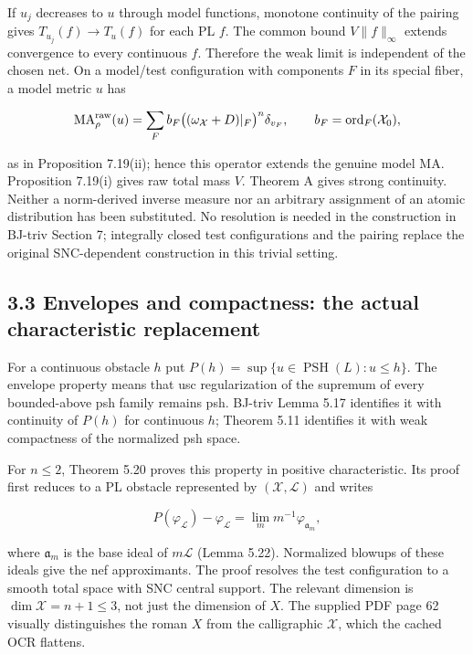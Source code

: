\documentclass[
  11pt,
]{article}
\begin{document}
If \(u_j\) decreases to \(u\) through model functions, monotone
continuity of the pairing gives \(T_{u_j}(f)\to T_u(f)\) for each PL
\(f\). The common bound \(V\|f\|_\infty\) extends convergence to every
continuous \(f\). Therefore the weak limit is independent of the chosen
net. On a model/test configuration with components \(F\) in its special
fiber, a model metric \(u\) has

\[\operatorname{MA}_{\rho}^{\rm raw}(u)=\sum_F b_F\bigl((\omega_{\mathcal X}+D)|_F\bigr)^n\delta_{v_F},\qquad b_F=\operatorname{ord}_F(\mathcal X_0),\]

as in Proposition 7.19(ii); hence this operator extends the genuine
model MA. Proposition 7.19(i) gives raw total mass \(V\). Theorem A
gives strong continuity. Neither a norm-derived inverse measure nor an
arbitrary assignment of an atomic distribution has been substituted. No
resolution is needed in the construction in BJ-triv Section 7;
integrally closed test configurations and the pairing replace the
original SNC-dependent construction in this trivial setting.

\subsection{3.3 Envelopes and compactness: the actual characteristic
replacement}\label{envelopes-and-compactness-the-actual-characteristic-replacement}

For a continuous obstacle \(h\) put
\(P(h)=\sup\{u\in\operatorname{PSH}(L):u\leq h\}\). The envelope
property means that usc regularization of the supremum of every
bounded-above psh family remains psh. BJ-triv Lemma 5.17 identifies it
with continuity of \(P(h)\) for continuous \(h\); Theorem 5.11
identifies it with weak compactness of the normalized psh space.

For \(n\leq2\), Theorem 5.20 proves this property in positive
characteristic. Its proof first reduces to a PL obstacle represented by
\((\mathcal X,\mathcal L)\) and writes

\[P(\varphi_{\mathcal L})-\varphi_{\mathcal L}=\lim_m m^{-1}\varphi_{\mathfrak a_m},\]

where \(\mathfrak a_m\) is the base ideal of \(m\mathcal L\) (Lemma
5.22). Normalized blowups of these ideals give the nef approximants. The
proof resolves the test configuration to a smooth total space with SNC
central support. The relevant dimension is
\textbf{\(\dim\mathcal X=n+1\leq3\)}, not just the dimension of \(X\).
The supplied PDF page 62 visually distinguishes the roman \(X\) from the
calligraphic \(\mathcal X\), which the cached OCR flattens.
\end{document}
